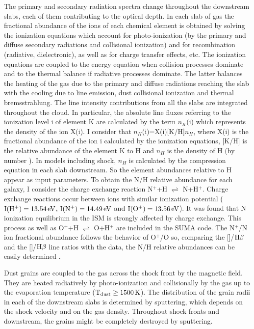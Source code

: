 \documentclass[../main.tex]{subfiles}
\begin{document}
The primary and secondary radiation spectra change throughout the downstream slabs, each of them contributing to the optical depth. 
In each slab of gas the fractional abundance of the ions of each chemical element is obtained by solving the ionization equations which account for photo-ionization (by the primary and diffuse secondary radiations and collisional ionization) and for  recombination (radiative, dielectronic), as well as for charge transfer effects, etc. 
The ionization equations are coupled to the energy equation when collision processes dominate \citep{Cox72} and to the thermal balance if radiative processes dominate. 
The latter balances the heating of the gas due to the primary and diffuse radiations reaching the slab with the cooling due to  
line emission, dust collisional ionization and thermal bremsstrahlung. 
The line intensity contributions from all the slabs are integrated throughout the cloud.
In particular, the absolute line fluxes referring to the ionization level i of element K are calculated by the term $n_K$(i) which represents the density of the ion X(i).
I consider that $n_K$(i)=X(i)[K/H]$n_H$, where X(i) is the fractional abundance of the ion i calculated by the ionization equations, [K/H] is the relative abundance of the element K to H and $n_H$ is the density of H (by number ). 
In models including shock, $n_H$ is calculated by the compression equation in each slab downstream. 
So the element abundances relative to H appear as input parameters.
To obtain the N/H relative abundance for each galaxy, I consider the charge exchange reaction  N$^+$+H $\rightleftharpoons$ N+H$^+$. 
Charge exchange reactions occur between ions with similar ionization potential ($\rm I(H^+)=13.54\,\si{ eV}$, $\rm I(N^+)=14.49\, \si{eV}$ and $\rm I(O^+)=13.56\,\si{ eV}$). 
It was found that N ionization equilibrium in the ISM is strongly affected by charge exchange.  
This process as well as O$^+$+H $\rightleftharpoons$ O+H$^+$  are included in the SUMA code.
The N$^+$/N ion fractional abundance follows the behavior of O$^+$/O so, comparing the []/$\rm H\beta$   and the []/$\rm H\beta$ line ratios with the data, the N/H relative abundances can be easily determined \citep[see][]{Contini12}.


Dust grains are coupled to the gas across the shock front by the magnetic field. 
They are heated radiatively by photo-ionization and collisionally by the gas up to the evaporation temperature ($\rm T_{\rm dust} \geq 1500\,\si{K}$). 
The distribution of the grain radii in each of the downstream slabs is determined by sputtering, which depends on the shock velocity and on the gas density. 
Throughout shock fronts and downstream, the grains might be completely destroyed by sputtering.
\end{document}
